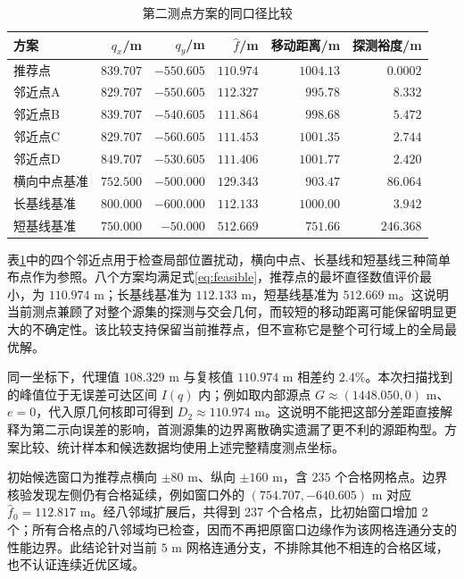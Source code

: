 \documentclass[zihao=-4,a4paper,UTF8,fontset=none]{ctexart}
\begin{document}
\begin{table}[htbp]
\centering\small
\caption{第二测点方案的同口径比较}
\label{tab:result}
\begin{tabular}{lrrrrr}
\toprule
方案 & $q_x$/m & $q_y$/m & $\widehat f$/m & 移动距离/m & 探测裕度/m\\
\midrule
推荐点 & $839.707$ & $-550.605$ & $110.974$ & $1004.13$ & $0.0002$ \\
邻近点A & $829.707$ & $-550.605$ & $112.327$ & $995.78$ & $8.332$ \\
邻近点B & $839.707$ & $-540.605$ & $111.864$ & $998.68$ & $5.472$ \\
邻近点C & $829.707$ & $-560.605$ & $111.453$ & $1001.35$ & $2.744$ \\
邻近点D & $849.707$ & $-530.605$ & $111.406$ & $1001.77$ & $2.420$ \\
横向中点基准 & $752.500$ & $-500.000$ & $129.343$ & $903.47$ & $86.064$ \\
长基线基准 & $800.000$ & $-600.000$ & $112.133$ & $1000.00$ & $3.942$ \\
短基线基准 & $750.000$ & $-50.000$ & $512.669$ & $751.66$ & $246.368$ \\
\bottomrule
\end{tabular}
\end{table}

表\ref{tab:result}中的四个邻近点用于检查局部位置扰动，横向中点、长基线和短基线三种简单布点作为参照。八个方案均满足式\eqref{eq:feasible}，推荐点的最坏直径数值评价最小，为 $110.974$ m；长基线基准为 $112.133$ m，短基线基准为 $512.669$ m。这说明当前测点兼顾了对整个源集的探测与交会几何，而较短的移动距离可能保留明显更大的不确定性。该比较支持保留当前推荐点，但不宣称它是整个可行域上的全局最优解。

同一坐标下，代理值 $108.329$ m 与复核值 $110.974$ m 相差约 $2.4\%$。本次扫描找到的峰值位于无误差可达区间 $I(q)$ 内；例如取内部源点 $G\approx(1448.050,0)$ m、$e=0$，代入原几何核即可得到 $D_2\approx110.974$ m。这说明不能把这部分差距直接解释为第二示向误差的影响，首测源集的边界离散确实遗漏了更不利的源距构型。方案比较、统计样本和候选数据均使用上述完整精度测点坐标。

初始候选窗口为推荐点横向 $\pm80$ m、纵向 $\pm160$ m，含 $235$ 个合格网格点。边界核验发现左侧仍有合格延续，例如窗口外的 $(754.707,-640.605)$ m 对应 $\widehat f_0=112.817$ m。经八邻域扩展后，共得到 237 个合格点，比初始窗口增加 2 个；所有合格点的八邻域均已检查，因而不再把原窗口边缘作为该网格连通分支的性能边界。此结论针对当前 $5$ m 网格连通分支，不排除其他不相连的合格区域，也不认证连续近优区域。
\end{document}
